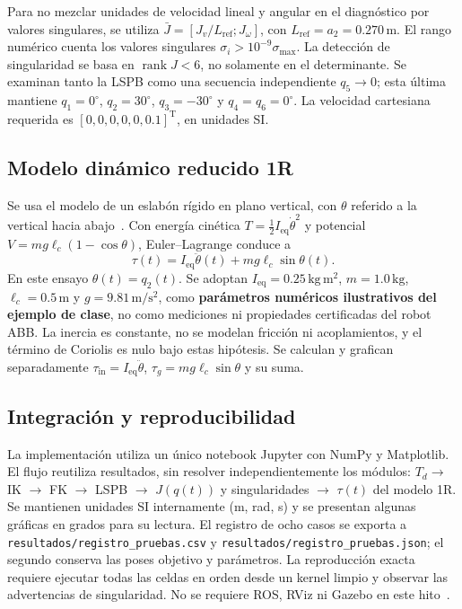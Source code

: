 \documentclass[conference,letterpaper]{IEEEtran}
\newcommand{\trans}{\mathrm{T}}
\begin{document}
	Para no mezclar unidades de velocidad lineal y angular en el diagnóstico por valores singulares, se utiliza \(\bar J=[J_v/L_{\mathrm{ref}};J_\omega]\), con \(L_{\mathrm{ref}}=a_2=0.270\,\mathrm{m}\). El rango numérico cuenta los valores singulares \(\sigma_i>10^{-9}\sigma_{\max}\). La detección de singularidad se basa en \(\operatorname{rank}J<6\), no solamente en el determinante. Se examinan tanto la LSPB como una secuencia independiente \(q_5\to0\); esta última mantiene \(q_1=0^\circ\), \(q_2=30^\circ\), \(q_3=-30^\circ\) y \(q_4=q_6=0^\circ\). La velocidad cartesiana requerida es \([0,0,0,0,0,0.1]^\trans\), en unidades SI.
	
	\subsection{Modelo dinámico reducido 1R}
	Se usa el modelo de un eslabón rígido en plano vertical, con \(\theta\) referido a la vertical hacia abajo~\cite{dinamica}. Con energía cinética \(T=\tfrac12I_{\mathrm{eq}}\dot\theta^2\) y potencial \(V=mg\ell_c(1-\cos\theta)\), Euler--Lagrange conduce a
	\begin{equation}
		\tau(t)=I_{\mathrm{eq}}\ddot\theta(t)+mg\ell_c\sin\theta(t).
		\label{eq:torque}
	\end{equation}
	En este ensayo \(\theta(t)=q_2(t)\). Se adoptan \(I_{\mathrm{eq}}=0.25\,\mathrm{kg\,m^2}\), \(m=1.0\,\mathrm{kg}\), \(\ell_c=0.5\,\mathrm{m}\) y \(g=9.81\,\mathrm{m/s^2}\), como \textbf{parámetros numéricos ilustrativos del ejemplo de clase}, no como mediciones ni propiedades certificadas del robot ABB. La inercia es constante, no se modelan fricción ni acoplamientos, y el término de Coriolis es nulo bajo estas hipótesis. Se calculan y grafican separadamente \(\tau_{\mathrm{in}}=I_{\mathrm{eq}}\ddot\theta\), \(\tau_g=mg\ell_c\sin\theta\) y su suma.
	
	\subsection{Integración y reproducibilidad}
	La implementación utiliza un único notebook Jupyter con NumPy y Matplotlib. El flujo reutiliza resultados, sin resolver independientemente los módulos: \(T_d\to\) IK \(\to\) FK \(\to\) LSPB \(\to\) \(J(q(t))\) y singularidades \(\to\) \(\tau(t)\) del modelo 1R. Se mantienen unidades SI internamente (m, rad, s) y se presentan algunas gráficas en grados para su lectura. El registro de ocho casos se exporta a \texttt{resultados/registro\_pruebas.csv} y \texttt{resultados/registro\_pruebas.json}; el segundo conserva las poses objetivo y parámetros. La reproducción exacta requiere ejecutar todas las celdas en orden desde un kernel limpio y observar las advertencias de singularidad. No se requiere ROS, RViz ni Gazebo en este hito~\cite{guia}.
	
\end{document}
